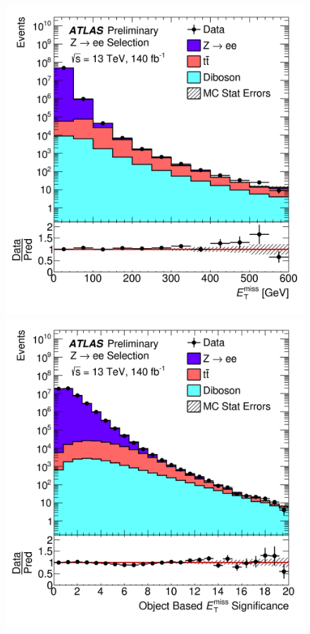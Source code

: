 \begin{figure}[!h]
    \centering
  \begin{minipage}[b]{0.45\textwidth}
  \includegraphics[width=\textwidth]{Pictures/ETMissPerf.png}
  \end{minipage}
  \hspace{.5cm}
  \begin{minipage}[b]{0.45\textwidth}
    \includegraphics[width=\textwidth]{Pictures/ETMissSig.png}

\end{minipage}
\end{figure}
